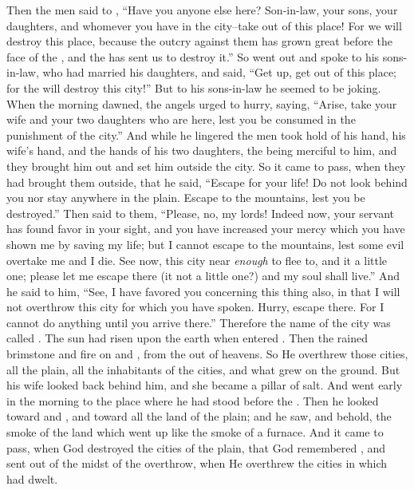
\bverse Then the men said to , ``Have you anyone else here? Son-in-law, your sons, your daughters, and whomever you have in the city--take \them out of this place!
\bverse For we will destroy this place, because the outcry against them has grown great before the face of the \lord, and the \lord has sent us to destroy it.''
\bverse So  went out and spoke to his sons-in-law, who had married his daughters, and said, ``Get up, get out of this place; for the \lord will destroy this city!'' But to his sons-in-law he seemed to be joking.
\bverse When the morning dawned, the angels urged  to hurry, saying, ``Arise, take your wife and your two daughters who are here, lest you be consumed in the punishment of the city.''
\bverse And while he lingered the men took hold of his hand, his wife's hand, and the hands of his two daughters, the \lord being merciful to him, and they brought him out and set him outside the city.
\bverse So it came to pass, when they had brought them outside, that he said, ``Escape for your life! Do not look behind you nor stay anywhere in the plain. Escape to the mountains, lest you be destroyed.''
\bverse Then  said to them, ``Please, no, my lords!
\bverse Indeed now, your servant has found favor in your sight, and you have increased your mercy which you have shown me by saving my life; but I cannot escape to the mountains, lest some evil overtake me and I die.
\bverse See now, this city \is near \textit{enough} to flee to, and it \is a little one; please let me escape there (\is it not a little one?) and my soul shall live.''
\bverse And he said to him, ``See, I have favored you concerning this thing also, in that I will not overthrow this city for which you have spoken.
\bverse Hurry, escape there. For I cannot do anything until you arrive there.'' Therefore the name of the city was called .
\bverse The sun had risen upon the earth when  entered . 
\bverse Then the \lord rained brimstone and fire on  and , from the \lord out of heavens.
\bverse So He overthrew those cities, all the plain, all the inhabitants of the cities, and what grew on the ground.
\bverse But his wife looked back behind him, and she became a pillar of salt.
\bverse And \Abraham went early in the morning to the place where he had stood before the \lord.
\bverse Then he looked toward  and , and toward all the land of the plain; and he saw, and behold, the smoke of the land which went up like the smoke of a furnace.
\bverse And it came to pass, when God destroyed the cities of the plain, that God remembered \Abraham, and sent  out of the midst of the overthrow, when He overthrew the cities in which  had dwelt.


